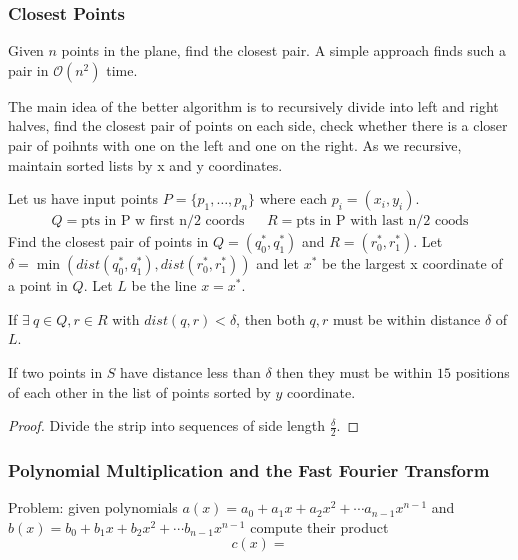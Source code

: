 \documentclass[12pt]{scrartcl}
\begin{document}
\subsubsection{Closest Points}

Given $n$ points in the plane, find the closest pair. A simple approach finds such a pair in 
$\mathcal{O}(n^2)$ time. 

The main idea of the better algorithm is to recursively divide into left and right halves, find the closest pair 
of points on each side, check whether there is a closer pair of poihnts with one on the left and one on the right. 
As we recursive, maintain sorted lists by x and y coordinates. 

Let us have input points $P = \{p_1, \ldots, p_n\}$ where each $p_i = (x_i, y_i)$. 
\begin{align*}
  Q = \text{pts in P w first n/2 coords} && R = \text{pts in P with last n/2 coods}
\end{align*}
Find the closest pair of points in $Q = (q_0^*, q_1^*)$ and $R = (r_0^*, r_1^*)$. Let 
$\delta = \min(dist(q_0^*, q_1^*), dist(r_0^*, r_1^*))$ and let $x^*$ be the largest x coordinate of a point in 
$Q$. Let $L$ be the line $x = x^*$. 

\begin{lemma}
  If $\exists \ q \in Q, r \in R$ with $dist(q, r) < \delta$, then both $q, r$ must be within distance $\delta$ of $L$. 
\end{lemma}

\begin{lemma}
  If two points in $S$ have distance less than $\delta$ then they must be within $15$ positions of each other in the 
  list of points sorted by $y$ coordinate. 
  \begin{proof}
    Divide the strip into sequences of side length $\frac{\delta}{2}$. 
  \end{proof}
\end{lemma}

\subsubsection{Polynomial Multiplication and the Fast Fourier Transform}

Problem: given polynomials $a(x) = a_0 + a_1x + a_2x^2 + \cdots a_{n-1}x^{n-1}$ and 
$b(x) = b_0 + b_1x + b_2x^2 + \cdots b_{n-1}x^{n-1}$ compute their product 
\[c(x) = \]
\end{document}
